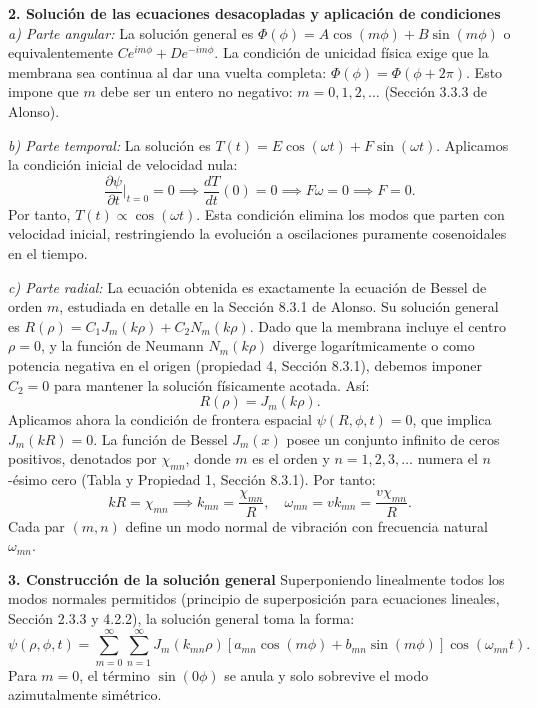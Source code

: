 \documentclass[a4paper]{article}
\begin{document}
\textbf{2. Solución de las ecuaciones desacopladas y aplicación de condiciones}
\textit{a) Parte angular:} La solución general es $\Phi(\phi) = A \cos(m\phi) + B \sin(m\phi)$ o equivalentemente $C e^{im\phi} + D e^{-im\phi}$. La condición de unicidad física exige que la membrana sea continua al dar una vuelta completa: $\Phi(\phi) = \Phi(\phi + 2\pi)$. Esto impone que $m$ debe ser un entero no negativo: $m = 0, 1, 2, \dots$ (Sección 3.3.3 de Alonso).

\textit{b) Parte temporal:} La solución es $T(t) = E \cos(\omega t) + F \sin(\omega t)$. Aplicamos la condición inicial de velocidad nula:
$$\frac{\partial \psi}{\partial t} \bigg|_{t=0} = 0 \implies \frac{dT}{dt}(0) = 0 \implies F \omega = 0 \implies F = 0.$$
Por tanto, $T(t) \propto \cos(\omega t)$. Esta condición elimina los modos que parten con velocidad inicial, restringiendo la evolución a oscilaciones puramente cosenoidales en el tiempo.

\textit{c) Parte radial:} La ecuación obtenida es exactamente la ecuación de Bessel de orden $m$, estudiada en detalle en la Sección 8.3.1 de Alonso. Su solución general es $R(\rho) = C_1 J_m(k\rho) + C_2 N_m(k\rho)$. Dado que la membrana incluye el centro $\rho = 0$, y la función de Neumann $N_m(k\rho)$ diverge logarítmicamente o como potencia negativa en el origen (propiedad 4, Sección 8.3.1), debemos imponer $C_2 = 0$ para mantener la solución físicamente acotada. Así:
$$R(\rho) = J_m(k\rho).$$
Aplicamos ahora la condición de frontera espacial $\psi(R, \phi, t) = 0$, que implica $J_m(kR) = 0$. La función de Bessel $J_m(x)$ posee un conjunto infinito de ceros positivos, denotados por $\chi_{mn}$, donde $m$ es el orden y $n = 1, 2, 3, \dots$ numera el $n$-ésimo cero (Tabla y Propiedad 1, Sección 8.3.1). Por tanto:
$$k R = \chi_{mn} \implies k_{mn} = \frac{\chi_{mn}}{R}, \quad \omega_{mn} = v k_{mn} = \frac{v \chi_{mn}}{R}.$$
Cada par $(m,n)$ define un modo normal de vibración con frecuencia natural $\omega_{mn}$.

\textbf{3. Construcción de la solución general}
Superponiendo linealmente todos los modos normales permitidos (principio de superposición para ecuaciones lineales, Sección 2.3.3 y 4.2.2), la solución general toma la forma:
$$\psi(\rho, \phi, t) = \sum_{m=0}^{\infty} \sum_{n=1}^{\infty} J_m(k_{mn} \rho) \left[ a_{mn} \cos(m\phi) + b_{mn} \sin(m\phi) \right] \cos(\omega_{mn} t).$$
Para $m=0$, el término $\sin(0\phi)$ se anula y solo sobrevive el modo azimutalmente simétrico.
\end{document}
